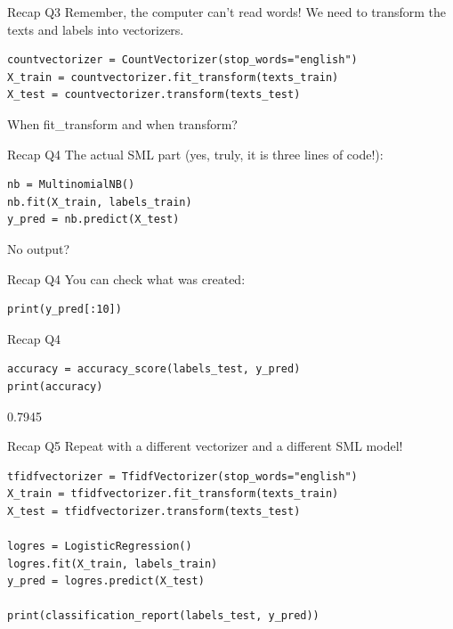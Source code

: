 \documentclass[handout]{beamer}
\begin{document}
\begin{frame}[fragile]{Recap Q3}
Remember, the computer can't read words! We need to transform the texts and labels into vectorizers.
\begin{lstlisting}
countvectorizer = CountVectorizer(stop_words="english")
X_train = countvectorizer.fit_transform(texts_train)
X_test = countvectorizer.transform(texts_test)
\end{lstlisting}

When fit\_transform and when transform?
\end{frame}


\begin{frame}[fragile]{Recap Q4}
The actual SML part (yes, truly, it is three lines of code!):
\begin{lstlisting}
nb = MultinomialNB()
nb.fit(X_train, labels_train)
y_pred = nb.predict(X_test)
\end{lstlisting}
	
No output?
\end{frame}

\begin{frame}[fragile]{Recap Q4}
You can check what was created:
\begin{lstlisting}
print(y_pred[:10])
\end{lstlisting}

\begin{lstlistingoutput}
\end{lstlistingoutput}
\end{frame}


\begin{frame}[fragile]{Recap Q4}

\begin{lstlisting}
accuracy = accuracy_score(labels_test, y_pred)
print(accuracy)
\end{lstlisting}
	
\begin{lstlistingoutput}
0.7945
\end{lstlistingoutput}
\end{frame}


\begin{frame}[fragile]{Recap Q5}
Repeat with a different vectorizer and a different SML model!
\begin{lstlisting}
tfidfvectorizer = TfidfVectorizer(stop_words="english")
X_train = tfidfvectorizer.fit_transform(texts_train)
X_test = tfidfvectorizer.transform(texts_test)

logres = LogisticRegression()
logres.fit(X_train, labels_train)
y_pred = logres.predict(X_test)

print(classification_report(labels_test, y_pred))
\end{lstlisting}
	
\end{frame}
\end{document}
